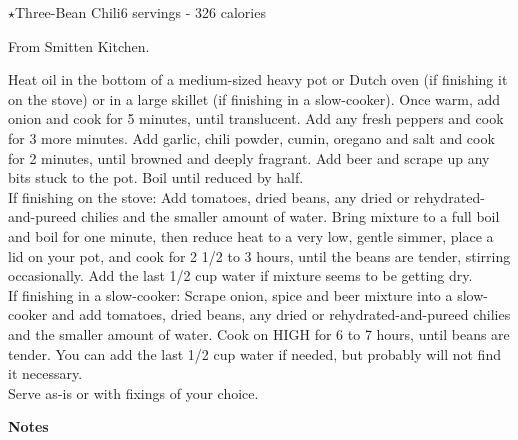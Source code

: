 \begin{recipe}{\texorpdfstring{$\star$}{str}Three-Bean Chili}{6 servings - 326 calories}{}

\freeform From Smitten Kitchen.


Heat oil in the bottom of a medium-sized heavy pot or Dutch oven (if finishing it on the stove) or in a large skillet (if finishing in a slow-cooker). Once warm, add onion and cook for 5 minutes, until translucent. Add any fresh peppers and cook for 3 more minutes. Add garlic, chili powder, cumin, oregano and salt and cook for 2 minutes, until browned and deeply fragrant. Add beer and scrape up any bits stuck to the pot. Boil until reduced by half.\\

If finishing on the stove: Add tomatoes, dried beans, any dried or rehydrated-and-pureed chilies and the smaller amount of water. Bring mixture to a full boil and boil for one minute, then reduce heat to a very low, gentle simmer, place a lid on your pot, and cook for 2 1/2 to 3 hours, until the beans are tender, stirring occasionally. Add the last 1/2 cup water if mixture seems to be getting dry.\\

If finishing in a slow-cooker: Scrape onion, spice and beer mixture into a slow-cooker and add tomatoes, dried beans, any dried or rehydrated-and-pureed chilies and the smaller amount of water. Cook on HIGH for 6 to 7 hours, until beans are tender. You can add the last 1/2 cup water if needed, but probably will not find it necessary.\\

Serve as-is or with fixings of your choice.\newpage

\textbf{Notes}


\end{recipe}
